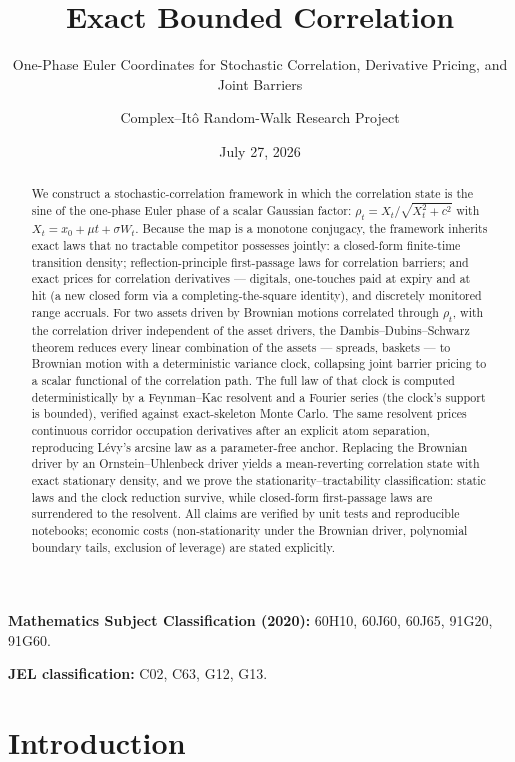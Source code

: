 \documentclass[
  english,
  10pt,
  letterpaper,
  DIV=11,
  numbers=noendperiod]{scrartcl}
\title{Exact Bounded Correlation}
\subtitle{One-Phase Euler Coordinates for Stochastic Correlation,
Derivative Pricing, and Joint Barriers}
\author{Complex--Itô Random-Walk Research Project}
\date{July 27, 2026}
\renewcommand*\contentsname{Table of contents}
\newcommand\contentsname{Table of contents}
\theoremstyle{plain}
\theoremstyle{plain}
\theoremstyle{plain}
\theoremstyle{plain}
\theoremstyle{definition}
\theoremstyle{remark}
\begin{document}
\maketitle
\begin{abstract}
We construct a stochastic-correlation framework in which the correlation
state is the sine of the one-phase Euler phase of a scalar Gaussian
factor: \(\rho_t=X_t/\sqrt{X_t^2+c^2}\) with
\(X_t=x_0+\mu t+\sigma W_t\). Because the map is a monotone conjugacy,
the framework inherits exact laws that no tractable competitor possesses
jointly: a closed-form finite-time transition density;
reflection-principle first-passage laws for correlation barriers; and
exact prices for correlation derivatives --- digitals, one-touches paid
at expiry and at hit (a new closed form via a completing-the-square
identity), and discretely monitored range accruals. For two assets
driven by Brownian motions correlated through \(\rho_t\), with the
correlation driver independent of the asset drivers, the
Dambis--Dubins--Schwarz theorem reduces every linear combination of the
assets --- spreads, baskets --- to Brownian motion with a deterministic
variance clock, collapsing joint barrier pricing to a scalar functional
of the correlation path. The full law of that clock is computed
deterministically by a Feynman--Kac resolvent and a Fourier series (the
clock's support is bounded), verified against exact-skeleton Monte
Carlo. The same resolvent prices continuous corridor occupation
derivatives after an explicit atom separation, reproducing Lévy's
arcsine law as a parameter-free anchor. Replacing the Brownian driver by
an Ornstein--Uhlenbeck driver yields a mean-reverting correlation state
with exact stationary density, and we prove the
stationarity--tractability classification: static laws and the clock
reduction survive, while closed-form first-passage laws are surrendered
to the resolvent. All claims are verified by unit tests and reproducible
notebooks; economic costs (non-stationarity under the Brownian driver,
polynomial boundary tails, exclusion of leverage) are stated explicitly.
\end{abstract}

\renewcommand*\contentsname{Table of contents}
{
\setcounter{tocdepth}{2}
\tableofcontents
}

\textbf{Mathematics Subject Classification (2020):} 60H10, 60J60, 60J65,
91G20, 91G60.

\textbf{JEL classification:} C02, C63, G12, G13.

\section{Introduction}\label{sec-introduction}
\end{document}
